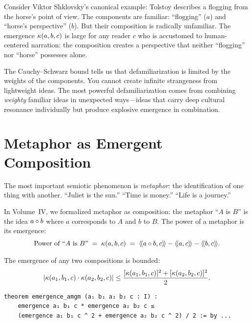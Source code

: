 \begin{interpretation}
Consider Viktor Shklovsky's canonical example: Tolstoy describes a flogging
from the horse's point of view. The components are familiar: ``flogging'' ($a$)
and ``horse's perspective'' ($b$). But their composition is radically unfamiliar.
The emergence $\kappa(a, b, c)$ is large for any reader $c$ who is accustomed
to human-centered narration: the composition creates a perspective that neither
``flogging'' nor ``horse'' possesses alone.

The Cauchy--Schwarz bound tells us that defamiliarization is limited by the
weights of the components. You cannot create infinite strangeness from
lightweight ideas. The most powerful defamiliarization comes from combining
\emph{weighty} familiar ideas in unexpected ways---ideas that carry deep
cultural resonance individually but produce explosive emergence in combination.
\end{interpretation}


\section{Metaphor as Emergent Composition}

The most important semiotic phenomenon is \emph{metaphor}: the identification
of one thing with another. ``Juliet is the sun.'' ``Time is money.'' ``Life
is a journey.''

In Volume~IV, we formalized metaphor as composition: the metaphor ``$A$ is $B$''
is the idea $a \circ b$ where $a$ corresponds to $A$ and $b$ to $B$. The
power of a metaphor is its emergence:
\[
  \text{Power of ``$A$ is $B$''} \;=\; \kappa(a, b, c)
  \;=\; \langle\!\langle a \circ b, c \rangle\!\rangle - \langle\!\langle a, c \rangle\!\rangle - \langle\!\langle b, c \rangle\!\rangle.
\]

\begin{theorem}
\label{thm:emergence-amgm}
The emergence of any two compositions is bounded:
\[
  |\kappa(a_1, b_1, c) \cdot \kappa(a_2, b_2, c)| \leq
  \frac{[\kappa(a_1,b_1,c)]^2 + [\kappa(a_2,b_2,c)]^2}{2}.
\]
\end{theorem}

\begin{lstlisting}[caption={Emergence AM-GM (IDT\_v3\_Emergence.lean)}]
theorem emergence_amgm (a₁ b₁ a₂ b₂ c : I) :
    emergence a₁ b₁ c * emergence a₂ b₂ c ≤
    (emergence a₁ b₁ c ^ 2 + emergence a₂ b₂ c ^ 2) / 2 := by ...
\end{lstlisting}

